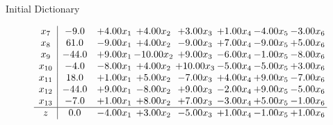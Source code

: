 \documentclass[8pt]{article}
\begin{document}
Initial Dictionary 

\[\begin{array}{c| c c@{\hskip 2pt} c@{\hskip 2pt} c@{\hskip 2pt} c@{\hskip 2pt} c@{\hskip 2pt} c@{\hskip 2pt} }
 x_{7}   &  -9.0 & +  4.00 x_{1} & +  4.00 x_{2} & +  3.00 x_{3} & +  1.00 x_{4} & -4.00 x_{5} & -3.00 x_{6}\\
 x_{8}   &  61.0 & -9.00 x_{1} & +  4.00 x_{2} & -9.00 x_{3} & +  7.00 x_{4} & -9.00 x_{5} & +  5.00 x_{6}\\
 x_{9}   &  -44.0 & +  9.00 x_{1} & -10.00 x_{2} & +  9.00 x_{3} & -6.00 x_{4} & -1.00 x_{5} & -8.00 x_{6}\\
 x_{10}   &  -4.0 & -8.00 x_{1} & +  4.00 x_{2} & + 10.00 x_{3} & -5.00 x_{4} & -5.00 x_{5} & +  3.00 x_{6}\\
 x_{11}   &  18.0 & +  1.00 x_{1} & +  5.00 x_{2} & -7.00 x_{3} & +  4.00 x_{4} & +  9.00 x_{5} & -7.00 x_{6}\\
 x_{12}   &  -44.0 & +  9.00 x_{1} & -8.00 x_{2} & +  9.00 x_{3} & -2.00 x_{4} & +  9.00 x_{5} & -5.00 x_{6}\\
 x_{13}   &  -7.0 & +  1.00 x_{1} & +  8.00 x_{2} & +  7.00 x_{3} & -3.00 x_{4} & +  5.00 x_{5} & -1.00 x_{6}\\
\hline
z    &  0.0 & -4.00 x_{1} & +  3.00 x_{2} & -5.00 x_{3} & +  1.00 x_{4} & -1.00 x_{5} & +  1.00 x_{6}\\
\end{array}\]
\end{document}
